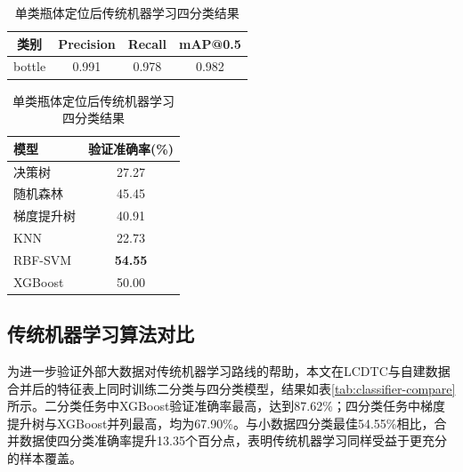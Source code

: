 \documentclass[withoutpreface,bwprint]{cumcmthesis}
\begin{document}
\begin{table}[htbp]
    \centering
    \begin{minipage}[t]{0.48\textwidth}
        \centering
        \caption{单类瓶体YOLO OBB定位性能}
        \label{tab:yolo-bottle-loc}
        \smallskip
        \small
        \begin{tabular}{cccc}
            \toprule
            类别 & Precision & Recall & mAP@0.5 \\
            \midrule
            bottle & 0.991 & 0.978 & 0.982 \\
            \bottomrule
        \end{tabular}
    \end{minipage}
    \hfill
    \begin{minipage}[t]{0.48\textwidth}
        \centering
        \caption{单类瓶体定位后传统机器学习四分类结果}
        \label{tab:two-stage-class-report}
        \smallskip
        \small
        \begin{tabular}{lc}
            \toprule
            模型 & 验证准确率(\%) \\
            \midrule
            决策树 & 27.27 \\
            随机森林 & 45.45 \\
            梯度提升树 & 40.91 \\
            KNN & 22.73 \\
            RBF-SVM & \textbf{54.55} \\
            XGBoost & 50.00 \\
            \bottomrule
        \end{tabular}
    \end{minipage}
\end{table}

\FloatBarrier

\subsection{传统机器学习算法对比}
为进一步验证外部大数据对传统机器学习路线的帮助，本文在LCDTC与自建数据合并后的特征表上同时训练二分类与四分类模型，结果如表\ref{tab:classifier-compare}所示。二分类任务中XGBoost验证准确率最高，达到87.62\%；四分类任务中梯度提升树与XGBoost并列最高，均为67.90\%。与小数据四分类最佳54.55\%相比，合并数据使四分类准确率提升13.35个百分点，表明传统机器学习同样受益于更充分的样本覆盖。
\end{document}
